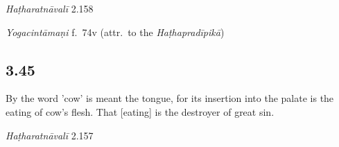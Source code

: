 \begin{ekdosis}

\begin{testimonia}[hp03_044]
\emph{Haṭharatnāvalī} 2.158
\begin{versinnote}
\end{versinnote}

\emph{Yogacintāmaṇi} f.~74v (attr.~to the \emph{Haṭhapradīpikā})
\begin{versinnote}
\end{versinnote}


\end{testimonia}


\subsection*{3.45}
\begin{translation}[hp03_045]
By the word 'cow' is meant the tongue, for its insertion into the palate is the eating of cow's flesh. That [eating] is the destroyer of great sin.
\end{translation}


\begin{testimonia}[hp03_045]
\emph{Haṭharatnāvalī} 2.157
\begin{versinnote}
\end{versinnote}


\end{testimonia}
\end{ekdosis}
